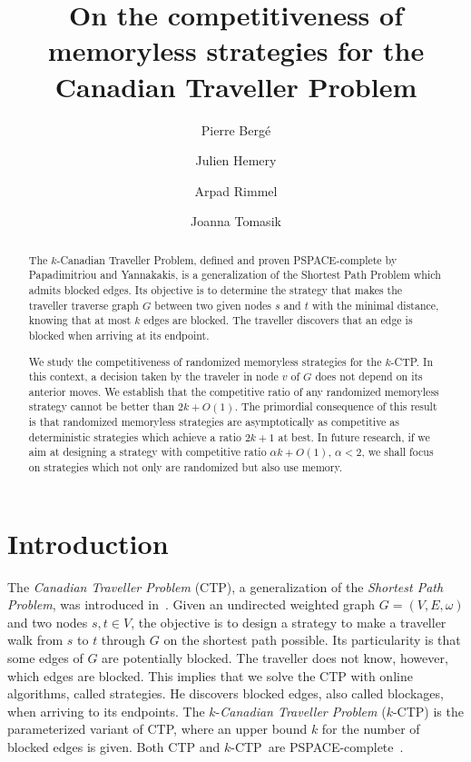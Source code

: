 \documentclass[preprint]{elsarticle}
\newcommand{\kctp}{$k$-CTP}
\begin{document}
\title{On the competitiveness of memoryless strategies for the Canadian Traveller Problem}
\author[upsud]{Pierre Berg\'e }
\author[cs]{Julien Hemery}
\author[cs]{Arpad Rimmel}
\author[cs]{Joanna Tomasik}
\address[upsud]{LRI, Universit\'e Paris-Sud, Universit\'e Paris-Saclay, 91405 Orsay Cedex, France}
\address[cs]{LRI, CentraleSup\' elec, Universit\'e Paris-Saclay, 91405 Orsay Cedex, France}

\begin{abstract}
The $k$-Canadian Traveller Problem, defined and proven PSPACE-complete by Papadimitriou and Yannakakis, is a generalization of the Shortest Path Problem which admits blocked edges. Its objective is to determine the strategy that makes the traveller traverse graph $G$ between two given nodes $s$ and $t$ with the minimal distance, knowing that at most $k$ edges are blocked. The traveller discovers that an edge is blocked when arriving at its endpoint. 
 
We study the competitiveness of randomized memoryless strategies for the \kctp . In this context, a decision taken by the traveler in node $v$ of $G$ does not depend on its anterior moves. We establish that the competitive ratio of any randomized memoryless strategy cannot be better than $2k + O\left(1\right)$. The primordial consequence of this result is that randomized memoryless strategies are asymptotically as competitive as deterministic strategies which achieve a ratio $2k+1$ at best. In future research, if we aim at designing a strategy with competitive ratio $\alpha k + O\left(1\right)$, $\alpha < 2$, we shall focus on strategies which not only are randomized but also use memory.
\end{abstract}

\maketitle


\section{Introduction}

The \textit{Canadian Traveller Problem} (CTP), a generalization of the \textit{Shortest Path Problem}, was introduced in~\cite{PaYa91}. Given an undirected weighted graph $G=(V,E,\omega)$ and two nodes $s,t \in V$, the objective is to design a strategy to make a traveller walk from $s$ to $t$ through $G$ on the shortest path possible. Its particularity is that some edges of $G$ are potentially blocked. The traveller does not know, however, which edges are blocked. This implies that we solve the CTP with online algorithms, called strategies. He discovers blocked edges, also called blockages, when arriving to its endpoints. The $k$-\textit{Canadian Traveller Problem} (\kctp) is the parameterized variant of CTP, where an upper bound $k$ for the number of blocked edges is given. Both CTP and \kctp ~are PSPACE-complete~\cite{BaSc91,PaYa91}.
\end{document}
